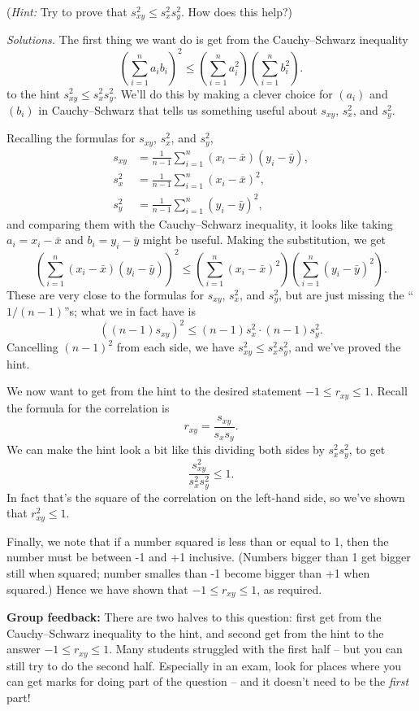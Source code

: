 \documentclass[
  a4paper,
]{book}
\theoremstyle{definition}
\theoremstyle{definition}
\theoremstyle{definition}
\theoremstyle{definition}
\theoremstyle{remark}
\begin{document}
(\emph{Hint:} Try to prove that \(s_{xy}^2 \leq s_x^2 s_y^2\). How does this help?)

\begin{myanswers}
\emph{Solutions.}
The first thing we want do is get from the Cauchy--Schwarz inequality
\[ \left( \sum_{i=1}^n a_i b_i \right)^2 \leq \left( \sum_{i=1}^n a_i^2 \right) \left(\sum_{i=1}^n b_i^2 \right) . \]
to the hint \(s_{xy}^2 \leq s_x^2 s_y^2\). We'll do this by making a clever choice for \((a_i)\) and \((b_i)\) in Cauchy--Schwarz that tells us something useful about \(s_{xy}\), \(s_x^2\), and \(s_y^2\).

Recalling the formulas for \(s_{xy}\), \(s_x^2\), and \(s_y^2\),
\begin{align*}
s_{xy} &= \frac{1}{n-1} \sum_{i=1}^n (x_i - \bar x)(y_i - \bar y) ,\\
s_{x}^2 &= \frac{1}{n-1} \sum_{i=1}^n (x_i - \bar x)^2 ,\\
s_{y}^2 &= \frac{1}{n-1} \sum_{i=1}^n (y_i - \bar y)^2 ,
\end{align*}
and comparing them with the Cauchy--Schwarz inequality, it looks like taking \(a_i = x_i - \bar x\) and \(b_i = y_i - \bar y\) might be useful. Making the substitution, we get
\[ \left( \sum_{i=1}^n (x_i - \bar x)(y_i - \bar y) \right)^2 \leq \left( \sum_{i=1}^n (x_i - \bar x)^2 \right) \left(\sum_{i=1}^n (y_i - \bar y)^2 \right) . \]
These are very close to the formulas for \(s_{xy}\), \(s_x^2\), and \(s_y^2\), but are just missing the ``\(1/(n-1)\)''s; what we in fact have is
\[ \left( (n-1) s_{xy} \right)^2 \leq (n-1)s_x^2 \cdot (n-1) s_y^2 .\]
Cancelling \((n-1)^2\) from each side, we have \(s_{xy}^2 \leq s_x^2 s_y^2\), and we've proved the hint.

We now want to get from the hint to the desired statement \(-1 \leq r_{xy} \leq 1\). Recall the formula for the correlation is
\[ r_{xy} = \frac{s_{xy}}{s_xs_y} . \]
We can make the hint look a bit like this dividing both sides by \(s_x^2 s_y^2\), to get
\[\frac{s_{xy}^2}{s_x^2 s_y^2} \leq 1.   \]
In fact that's the square of the correlation on the left-hand side, so we've shown that \(r_{xy}^2 \leq 1\).

Finally, we note that if a number squared is less than or equal to 1, then the number must be between -1 and +1 inclusive. (Numbers bigger than 1 get bigger still when squared; number smalles than -1 become bigger than +1 when squared.) Hence we have shown that \(-1 \leq r_{xy} \leq 1\), as required.

\textbf{Group feedback:} There are two halves to this question: first get from the Cauchy--Schwarz inequality to the hint, and second get from the hint to the answer \(-1 \leq r_{xy} \leq 1\). Many students struggled with the first half -- but you can still try to do the second half. Especially in an exam, look for places where you can get marks for doing part of the question -- and it doesn't need to be the \emph{first} part!

\end{myanswers}
\end{document}
